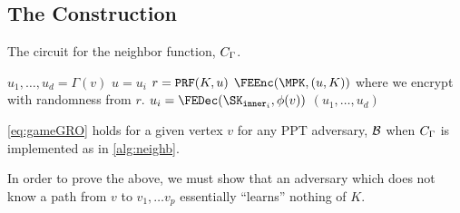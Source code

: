 \subsection{The Construction}
\begin{algorithm}[H]
	\caption{
		The circuit for the neighbor function, $C_\Gamma$.
	}
	\begin{algorithmic}[1]
			\State $u_1, \dots, u_d = \Gamma(v)$
			\State $u = u_i$
			\State $r = \texttt{PRF}(K, u)$
			\State \Return $\FEEnc(\MPK, (u, K))$ where we encrypt with randomness from $r$.
		\EndFunction
				\State $u_i = \FEDec(\SK_{\texttt{inner}_i}, \phi(v))$
			\EndFor
			\State \Return $(u_1, \dots, u_d)$
		\EndFunction
	\end{algorithmic}
	\label{alg:neighb}
\end{algorithm}

\begin{claim} 
	\label{claim:sec}
	\cref{eq:gameGRO} holds for a given vertex $v$ for any PPT adversary, $\mathcal{B}$ when $C_\Gamma$ is implemented as in \cref{alg:neighb}.
\end{claim}
In order to prove the above, we must show that an adversary which does not know a path from $v$ to $v_1, \dots v_p$
essentially ``learns'' nothing of $K$.

